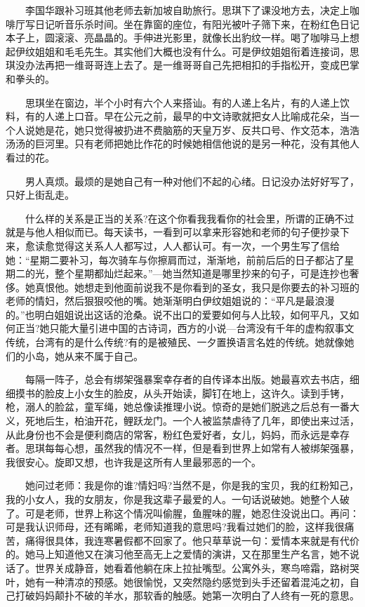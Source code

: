 \documentclass[12pt,UTF8]{ctexbook}
\begin{document}
　　李国华跟补习班其他老师去新加坡自助旅行。思琪下了课没地方去，决定上咖啡厅写日记听音乐杀时间。坐在靠窗的座位，有阳光被叶子筛下来，在粉红色日记本子上，圆滚滚、亮晶晶的。手伸进光影里，就像长出豹纹一样。喝了咖啡马上想起伊纹姐姐和毛毛先生。其实他们大概也没有什么。可是伊纹姐姐衔着连接词，思琪没办法再把一维哥哥连上去了。是一维哥哥自己先把相扣的手指松开，变成巴掌和拳头的。

　　思琪坐在窗边，半个小时有六个人来搭讪。有的人递上名片，有的人递上饮料，有的人递上口音。早在公元之前，最早的中文诗歌就把女人比喻成花朵，当一个人说她是花，她只觉得被扔进不费脑筋的天皇万岁、反共口号、作文范本，浩浩汤汤的巨河里。只有老师把她比作花的时候她相信他说的是另一种花，没有其他人看过的花。

　　男人真烦。最烦的是她自己有一种对他们不起的心绪。日记没办法好好写了，只好上街乱走。

　　什么样的关系是正当的关系?在这个你看我我看你的社会里，所谓的正确不过就是与他人相似而已。每天读书，一看到可以拿来形容她和老师的句子便抄录下来，愈读愈觉得这关系人人都写过，人人都认可。有一次，一个男生写了信给她：\enquote{星期二要补习，每次骑车与你擦肩而过，渐渐地，前前后后的日子都沾了星期二的光，整个星期都灿烂起来。}---她当然知道是哪里抄来的句子，可是连抄也奢侈。她真恨他。她想走到他面前说我不是你看到的圣女，我只是你要去的补习班的老师的情妇，然后狠狠咬他的嘴。她渐渐明白伊纹姐姐说的：\enquote{平凡是最浪漫的。}也明白姐姐说出这话的沧桑。说不出口的爱要如何与人比较，如何平凡，又如何正当?她只能大量引进中国的古诗词，西方的小说---台湾没有千年的虚构叙事文传统，台湾有的是什么传统?有的是被殖民、一夕置换语言名姓的传统。她就像她们的小岛，她从来不属于自己。

　　每隔一阵子，总会有绑架强暴案幸存者的自传译本出版。她最喜欢去书店，细细摸书的脸皮上小女生的脸皮，从头开始读，脚钉在地上，这许久。读到手铐，枪，溺人的脸盆，童军绳，她总像读推理小说。惊奇的是她们脱逃之后总有一番大义，死地后生，柏油开花，鲤跃龙门。一个人被监禁虐待了几年，即使出来过活，从此身份也不会是便利商店的常客，粉红色爱好者，女儿，妈妈，而永远是幸存者。思琪每每心想，虽然我的情况不一样，但是看到世界上如常有人被绑架强暴，我很安心。旋即又想，也许我是这所有人里最邪恶的一个。

　　她问过老师：我是你的谁?情妇吗?当然不是，你是我的宝贝，我的红粉知己，我的小女人，我的女朋友，你是我这辈子最爱的人。一句话说破她。她整个人破了。可是老师，世界上称这个情况叫偷腥，鱼腥味的腥，她忍住没说出口。再问：可是我认识师母，还有晞晞，老师知道我的意思吗?我看过她们的脸，这样我很痛苦，痛得很具体，我连寒暑假都不回家了。他只草草说一句：爱情本来就是有代价的。她马上知道他又在演习他至高无上之爱情的演讲，又在那里生产名言，她不说话了。世界关成静音，她看着他躺在床上拉扯嘴型。公寓外头，寒鸟啼霜，路树哭叶，她有一种清凉的预感。她很愉悦，又突然隐约感觉到头手还留着混沌之初，自己打破妈妈颠扑不破的羊水，那软香的触感。她第一次明白了人终有一死的意思。
\end{document}
